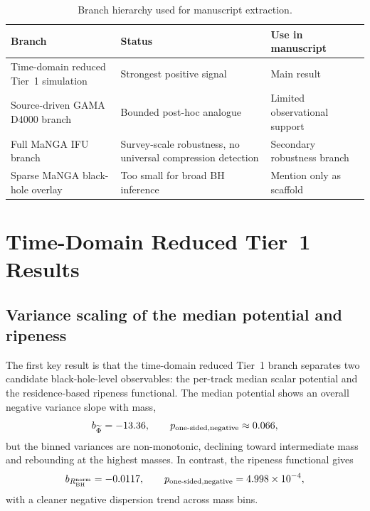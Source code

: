 \documentclass[11pt]{article}
\begin{document}
\begin{table}[H]
\centering
\caption{Branch hierarchy used for manuscript extraction.}
\label{tab:branch_hierarchy}
\begin{tabular}{p{4.0cm}p{4.2cm}p{5.3cm}}
\toprule
Branch & Status & Use in manuscript \\
\midrule
Time-domain reduced Tier~1 simulation & Strongest positive signal & Main result \\
Source-driven GAMA D4000 branch & Bounded post-hoc analogue & Limited observational support \\
Full MaNGA IFU branch & Survey-scale robustness, no universal compression detection & Secondary robustness branch \\
Sparse MaNGA black-hole overlay & Too small for broad BH inference & Mention only as scaffold \\
\bottomrule
\end{tabular}
\end{table}

\section{Time-Domain Reduced Tier~1 Results}

\subsection{Variance scaling of the median potential and ripeness}

The first key result is that the time-domain reduced Tier~1 branch separates two candidate black-hole-level observables: the per-track median scalar potential and the residence-based ripeness functional. The median potential shows an overall negative variance slope with mass,
\begin{equation}
b_{\widetilde\Phi}=-13.36, \qquad p_{\rm one\text{-}sided,negative}\approx 0.066,
\end{equation}
but the binned variances are non-monotonic, declining toward intermediate mass and rebounding at the highest masses. In contrast, the ripeness functional gives
\begin{equation}
b_{R_{\rm BH}^{\rm norm}}=-0.0117, \qquad p_{\rm one\text{-}sided,negative}=4.998\times 10^{-4},
\end{equation}
with a cleaner negative dispersion trend across mass bins.
\end{document}
